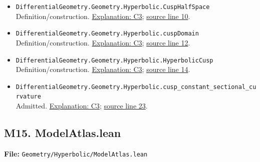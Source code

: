 \documentclass[
  letterpaper,
  11pt]{article}
\begin{document}
\begin{itemize}
\item
  {\small\texttt{Differential\allowbreak{}Geometry.\allowbreak{}Geometry.\allowbreak{}Hyperbolic.\allowbreak{}Cusp\allowbreak{}Half\allowbreak{}Space}}\\
  Definition/construction. \hyperref[collapse-cuspmodel]{Explanation:
  C3};
  \href{https://github.com/qinz1yang/differential-geometry-dev/blob/ea0fae60ee01ef8c8d9b57a51794c6538f679c5d/DifferentialGeometry/Geometry/Hyperbolic/Cusp.lean\#L10}{source
  line 10}.
\item
  {\small\texttt{Differential\allowbreak{}Geometry.\allowbreak{}Geometry.\allowbreak{}Hyperbolic.\allowbreak{}cusp\allowbreak{}Domain}}\\
  Definition/construction. \hyperref[collapse-cuspmodel]{Explanation:
  C3};
  \href{https://github.com/qinz1yang/differential-geometry-dev/blob/ea0fae60ee01ef8c8d9b57a51794c6538f679c5d/DifferentialGeometry/Geometry/Hyperbolic/Cusp.lean\#L12}{source
  line 12}.
\item
  {\small\texttt{Differential\allowbreak{}Geometry.\allowbreak{}Geometry.\allowbreak{}Hyperbolic.\allowbreak{}Hyperbolic\allowbreak{}Cusp}}\\
  Definition/construction. \hyperref[collapse-cuspmodel]{Explanation:
  C3};
  \href{https://github.com/qinz1yang/differential-geometry-dev/blob/ea0fae60ee01ef8c8d9b57a51794c6538f679c5d/DifferentialGeometry/Geometry/Hyperbolic/Cusp.lean\#L14}{source
  line 14}.
\item
  {\small\texttt{Differential\allowbreak{}Geometry.\allowbreak{}Geometry.\allowbreak{}Hyperbolic.\allowbreak{}cusp\_\allowbreak{}constant\_\allowbreak{}sectional\_\allowbreak{}curvature}}\\
  Admitted. \hyperref[collapse-cuspmodel]{Explanation: C3};
  \href{https://github.com/qinz1yang/differential-geometry-dev/blob/ea0fae60ee01ef8c8d9b57a51794c6538f679c5d/DifferentialGeometry/Geometry/Hyperbolic/Cusp.lean\#L23}{source
  line 23}.
\end{itemize}


\subsection{M15. ModelAtlas.lean}\label{m15.-modelatlas.lean}

\textbf{File:}
{\small\texttt{Geometry/\allowbreak{}Hyperbolic/\allowbreak{}Model\allowbreak{}Atlas.\allowbreak{}lean}}
\end{document}
